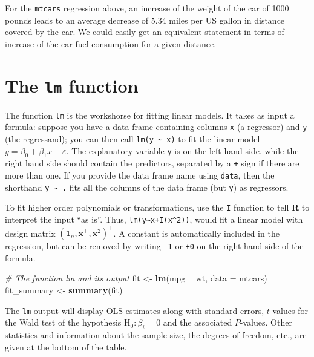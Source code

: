 \documentclass[]{book}
\newenvironment{Shaded}{\begin{snugshade}}{\end{snugshade}}
\newcommand{\KeywordTok}[1]{\textcolor[rgb]{0.13,0.29,0.53}{\textbf{#1}}}
\newcommand{\DataTypeTok}[1]{\textcolor[rgb]{0.13,0.29,0.53}{#1}}
\newcommand{\StringTok}[1]{\textcolor[rgb]{0.31,0.60,0.02}{#1}}
\newcommand{\CommentTok}[1]{\textcolor[rgb]{0.56,0.35,0.01}{\textit{#1}}}
\newcommand{\OperatorTok}[1]{\textcolor[rgb]{0.81,0.36,0.00}{\textbf{#1}}}
\newcommand{\NormalTok}[1]{#1}
\theoremstyle{definition}
\theoremstyle{definition}
\theoremstyle{definition}
\theoremstyle{remark}
\begin{document}
For the \texttt{mtcars} regression above, an increase of the weight of
the car of 1000 pounds leads to an average decrease of 5.34 miles per US
gallon in distance covered by the car. We could easily get an equivalent
statement in terms of increase of the car fuel consumption for a given
distance.

\section{\texorpdfstring{The \texttt{lm}
function}{The lm function}}\label{the-lm-function}

The function \texttt{lm} is the workshorse for fitting linear models. It
takes as input a formula: suppose you have a data frame containing
columns \texttt{x} (a regressor) and \texttt{y} (the regressand); you
can then call \texttt{lm(y\ \textasciitilde{}\ x)} to fit the linear
model \(y = \beta_0 + \beta_1x + \varepsilon\). The explanatory variable
\texttt{y} is on the left hand side, while the right hand side should
contain the predictors, separated by a \texttt{+} sign if there are more
than one. If you provide the data frame name using \texttt{data}, then
the shorthand \texttt{y\ \textasciitilde{}\ .} fits all the columns of
the data frame (but \texttt{y}) as regressors.

To fit higher order polynomials or transformations, use the \texttt{I}
function to tell \textbf{R} to interpret the input ``as is''. Thus,
\texttt{lm(y\textasciitilde{}x+I(x\^{}2))}, would fit a linear model
with design matrix
\((\boldsymbol{1}_n, \mathbf{x}^\top, \mathbf{x}^2)^\top\). A constant
is automatically included in the regression, but can be removed by
writing \texttt{-1} or \texttt{+0} on the right hand side of the
formula.

\begin{Shaded}
\begin{Highlighting}[]
\CommentTok{# The function lm and its output}
\NormalTok{fit <-}\StringTok{ }\KeywordTok{lm}\NormalTok{(mpg }\OperatorTok{~}\StringTok{ }\NormalTok{wt, }\DataTypeTok{data =}\NormalTok{ mtcars)}
\NormalTok{fit_summary <-}\StringTok{ }\KeywordTok{summary}\NormalTok{(fit)}
\end{Highlighting}
\end{Shaded}

The \texttt{lm} output will display OLS estimates along with standard
errors, \(t\) values for the Wald test of the hypothesis
\(\mathrm{H}_0: \beta_i=0\) and the associated \(P\)-values. Other
statistics and information about the sample size, the degrees of
freedom, etc., are given at the bottom of the table.
\end{document}

